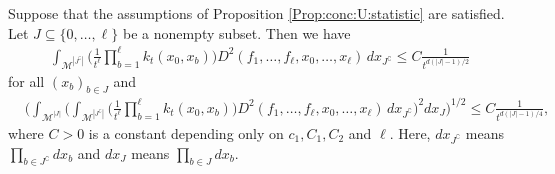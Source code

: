 \documentclass[10pt,a4paper]{amsart}
\begin{document}
\begin{lemma}\label{lemma:bounds:apply:U:concentation}
    Suppose that the assumptions of Proposition \ref{Prop:conc:U:statistic} are satisfied. Let $J\subseteq \{0,\dots,\ell\}$ be a nonempty subset. Then we have
    \begin{align}\label{eq:bounds:apply:U:concentation:1}
    \int_{\mathcal{M}^{|J^\complement|}}\Big(\frac{1}{t^\ell}\prod_{b=1}^\ell k_t(x_0,x_b)\Big) D^2(f_1,\dots,f_\ell,x_0,\dots,x_\ell)\, dx_{J^\complement}\leq C\frac{1}{t^{d(|J|-1)/2}}    
    \end{align}
    for all $(x_b)_{b\in J}$ and
    \begin{align}\label{eq:bounds:apply:U:concentation:2}
    &\Big(\int_{\mathcal{M}^{|J|}}\Big(\int_{\mathcal{M}^{|J^\complement|}}\Big(\frac{1}{t^\ell}\prod_{b=1}^\ell k_t(x_0,x_b)\Big) D^2(f_1,\dots,f_\ell,x_0,\dots,x_\ell)\, dx_{J^\complement}\Big)^2dx_J\Big)^{1/2}\leq C\frac{1}{t^{d(|J|-1)/4}},
    \end{align}
    where $C>0$ is a constant depending only on $c_1,C_1,C_2$ and $\ell$. Here, $dx_{J^\complement}$ means $\prod_{b\in J^\complement}dx_b$ and $dx_J$ means $\prod_{b\in J}dx_b$.
\end{lemma}
\end{document}
